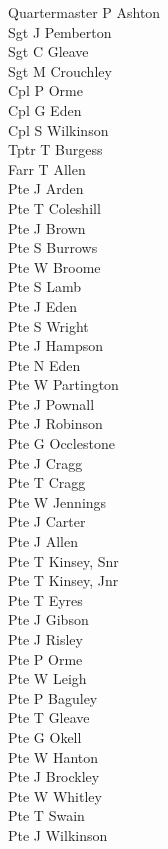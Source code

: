 \begin{multicols}{3}
  \small
  \noindent
  Quartermaster P Ashton \\
  Sgt J Pemberton \\
  Sgt C Gleave \\
  Sgt M Crouchley \\
  Cpl P Orme \\
  Cpl G Eden \\
  Cpl S Wilkinson \\
  Tptr T Burgess \\
  Farr T Allen \\
  Pte J Arden \\
  Pte T Coleshill \\
  Pte J Brown \\
  Pte S Burrows \\
  Pte W Broome \\
  Pte S Lamb \\
  Pte J Eden \\
  Pte S Wright \\
  Pte J Hampson \\
  Pte N Eden \\
  Pte W Partington \\
  Pte J Pownall \\
  Pte J Robinson \\
  Pte G Occlestone \\
  Pte J Cragg \\
  Pte T Cragg \\
  Pte W Jennings \\
  Pte J Carter \\
  Pte J Allen \\
  Pte T Kinsey, Snr \\
  Pte T Kinsey, Jnr \\
  Pte T Eyres \\
  Pte J Gibson \\
  Pte J Risley \\
  Pte P Orme \\
  Pte W Leigh \\
  Pte P Baguley \\
  Pte T Gleave \\
  Pte G Okell \\
  Pte W Hanton \\
  Pte J Brockley \\
  Pte W Whitley \\
  Pte T Swain \\
  Pte J Wilkinson \\

\end{multicols}
